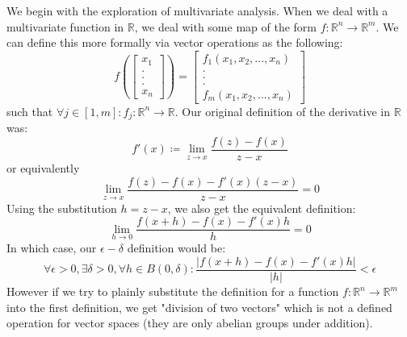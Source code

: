 \documentclass[10pt,letterpaper]{article} %
\begin{document}
We begin with the exploration of multivariate analysis. When we deal with a multivariate function in $\mathbb{R}$, we deal with some map of the form $f: \mathbb{R}^n \xrightarrow{} \mathbb{R}^m$. We can define this more formally via vector operations as the following:
\begin{equation}
f \left(\begin{bmatrix}
x_1\\.\\.\\.\\x_n
\end{bmatrix}\right) = \begin{bmatrix}
f_1(x_1, x_2, ..., x_n)\\
.\\.\\.\\
f_m(x_1, x_2, ..., x_n)
\end{bmatrix}
\end{equation}
such that $\forall j \in [1, m]: f_j: \mathbb{R}^n \xrightarrow{} \mathbb{R}$. Our original definition of the derivative in $\mathbb{R}$ was:
\begin{equation*}
f'(x) \coloneq \lim_{z \xrightarrow{} x} \frac{f(z) - f(x)}{z-x}
\end{equation*}
or equivalently
\begin{equation*}
\lim_{z \xrightarrow{} x} \frac{f(z) - f(x) - f'(x)(z-x)}{z-x} =0
\end{equation*}
Using the substitution $h = z-x$, we also get the equivalent definition:
\begin{equation*}
\lim_{h \xrightarrow{} 0}\frac{f(x+h) - f(x) - f'(x)h}{h} = 0
\end{equation*}
In which case, our $\epsilon-\delta$ definition would be:
\begin{equation*}
\forall \epsilon > 0, \exists \delta > 0, \forall h \in B(0, \delta): \frac{|f(x+h) - f(x) - f'(x)h|}{|h|} < \epsilon
\end{equation*}
However if we try to plainly substitute the definition for a function $f: \mathbb{R}^n \xrightarrow{} \mathbb{R}^m$ into the first definition, we get "division of two vectors" which is not a defined operation for vector spaces (they are only abelian groups under addition).\\
\end{document}
